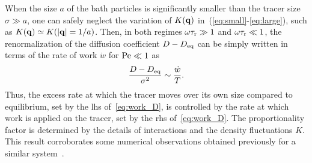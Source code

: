\documentclass[pre, superscriptaddress, twocolumn,pre]{revtex4-1}
\begin{document}
When the size $a$ of the bath particles is significantly smaller than the tracer size $\sigma\gg a$, one can safely neglect the variation of $K({\bf q})$ in~(\ref{eq:small}-\ref{eq:large}), such as $K({\bf q}) \simeq K(|{\bf q}|=1/a)$. Then, in both regimes $\omega\tau_{\rm r}\gg 1$ and $\omega\tau_{\rm r}\ll 1$, the renormalization of the diffusion coefficient $D-D_{\rm eq}$ can be simply written in terms of the rate of work $\dot w$ for ${\rm Pe}\ll1$ as
\begin{equation}\label{eq:work_D}
	\frac{D-D_{\rm eq}}{\sigma^2} \sim \frac{\dot w}{T} .
\end{equation}
Thus, the excess rate at which the tracer moves over its own size compared to equilibrium, set by the lhs of~\eqref{eq:work_D}, is controlled by the rate at which work is applied on the tracer, set by the rhs of~\eqref{eq:work_D}. The proportionality factor is determined by the details of interactions and the density fluctuations $K$. This result corroborates some numerical observations obtained previously for a similar system~\cite{delJunco2018}.
\end{document}
